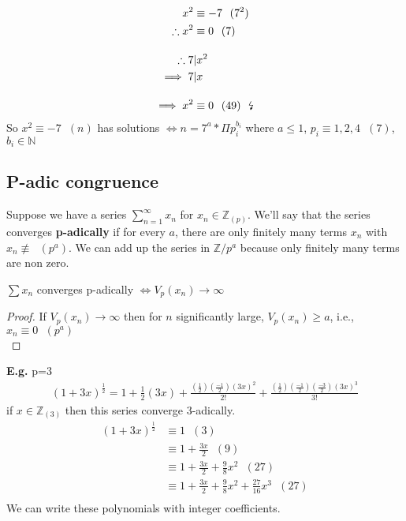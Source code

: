 \documentclass[11pt]{article}
\begin{document}
\begin{align*}
	x^2 &\equiv -7 \hspace{7pt} (7^2)\\
	\therefore x^2 &\equiv 0\hspace{7pt} (7) \\[1em]
	\therefore 7 &| x^2\\
	\implies  7 &| x\\[1em]
	\implies x^2 &\equiv 0 \hspace{7pt} (49)\hspace{7pt} \text{\lightning} 
\end{align*}
So $x^2 \equiv -7\hspace{7pt} (n) $ has solutions $\iff n = 7^a * \Pi p_i^{b_i}$ where $a\leq 1$, $p_i \equiv 1,2,4\hspace{7pt} (7)$, $b_i \in \mathbb{N}$

\subsection{P-adic congruence}
Suppose we have a series $\sum^\infty_{n=1} x_n $ for $x_n \in \mathbb{Z}_{(p)}$. We'll say that the series converges \textbf{p-adically} if for every $a$, there are only finitely many terms $x_n$ with $x_n \not \equiv \hspace{7pt} (p^a)$. We can add up the series in $\mathbb{Z}/p^a$ because only finitely many terms are non zero.


\begin{lemma}
	$\sum x_n$ converges p-adically $\iff V_p(x_n) \rightarrow \infty$ 
\end{lemma}
\begin{proof}
	If $V_p(x_n) \rightarrow \infty$ then for $n$ significantly large, $V_p(x_n) \geq a$, i.e., $x_n\equiv 0 \hspace{7pt} (p^a)$ \\[0.5em]
\end{proof}

\textbf{E.g.} p=3
\begin{align*}
	(1+3x)^{\frac{1}{2}} = 1 + \frac{1}{2}(3x) + \frac{(\frac{1}{2}) (\frac{-1}{2}) (3x)^2}{2!} + \frac{(\frac{1}{2}) (\frac{-1}{2}) (\frac{-3}{2})(3x)^3 }{3!}
\end{align*}
	if $x \in \mathbb{Z}_{(3)}$ then this series converge 3-adically.
	\newpage
\begin{align*}
	(1+3x)^{\frac{1}{2}} &\equiv 1 \hspace{7pt} (3)\\
	&\equiv 1 + \frac{3x}{2} \hspace{7pt} (9)\\
	&\equiv 1 + \frac{3x}{2} + \frac{9}{8}x^2\hspace{7pt} (27)\\
	&\equiv 1 + \frac{3x}{2} + \frac{9}{8}x^2 + \frac{27}{16}x^3 \hspace{7pt} (27)\\
\end{align*}
	We can write these polynomials with integer coefficients.
	
	
	
	
	
	
	
\end{document}
